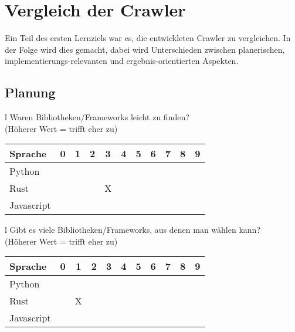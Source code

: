 \chapter{Vergleich der Crawler}
Ein Teil des ersten Lernziels war es, die entwickleten Crawler zu vergleichen.
In der Folge wird dies gemacht, dabei wird Unterschieden zwischen
planerischen, implementierungs-relevanten und ergebnis-orientierten Aspekten.


\section{Planung}

\begin{tabular}{l}
	Waren Bibliotheken/Frameworks leicht zu finden? \\
	(Höherer Wert = trifft eher zu)                 \\
	\begin{tabular}{| l | c | c | c | c | c | c | c | c | c | c |}
		\hline
		Sprache    & 0 & 1 & 2 & 3 & 4 & 5 & 6 & 7 & 8 & 9 \\
		\hline
		Python     &   &   &   &   &   &   &   &   &   &   \\
		\hline
		Rust       &   &   &   & X &   &   &   &   &   &   \\
		\hline
		Javascript &   &   &   &   &   &   &   &   &   &   \\
		\hline
	\end{tabular}
\end{tabular}

\begin{tabular}{l}
	Gibt es viele Bibliotheken/Frameworks, aus denen man wählen kann? \\
	(Höherer Wert = trifft eher zu)                                   \\
	\begin{tabular}{| l | c | c | c | c | c | c | c | c | c | c |}
		\hline
		Sprache    & 0 & 1 & 2 & 3 & 4 & 5 & 6 & 7 & 8 & 9 \\
		\hline
		Python     &   &   &   &   &   &   &   &   &   &   \\
		\hline
		Rust       &   & X &   &   &   &   &   &   &   &   \\
		\hline
		Javascript &   &   &   &   &   &   &   &   &   &   \\
		\hline
	\end{tabular}
\end{tabular}

